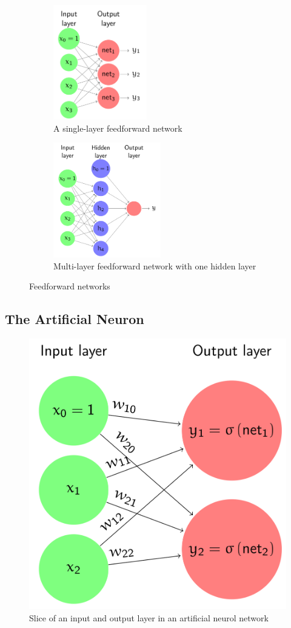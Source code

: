 \documentclass[11pt]{article}
\begin{document}
\begin{figure}[tbh!]
    \centering
    \begin{subfigure}{0.45\linewidth}
        \centering
        \includegraphics[keepaspectratio, height=5cm]{Pictures/singlelayer_feedforward_network}
        \caption{A single-layer feedforward network}
    \end{subfigure}
    \hfill
    \begin{subfigure}{0.45\linewidth}
        \centering
        \includegraphics[keepaspectratio, height=5cm]{Pictures/multilayer_feedforward_network}
        \caption{Multi-layer feedforward network with one hidden layer}
    \end{subfigure}
    \caption{Feedforward networks}
    \label{fig:feedforwardnetworks}
\end{figure}

\subsection{The Artificial Neuron}

\begin{figure}[tbh!]
    \centering
    \includegraphics[width=0.5\linewidth, keepaspectratio]{Pictures/artificial_neuron_layers}
    \caption{Slice of an input and output layer in an artificial neurol network}
    \label{fig:artificialneuronlayers}
\end{figure}
\end{document}
